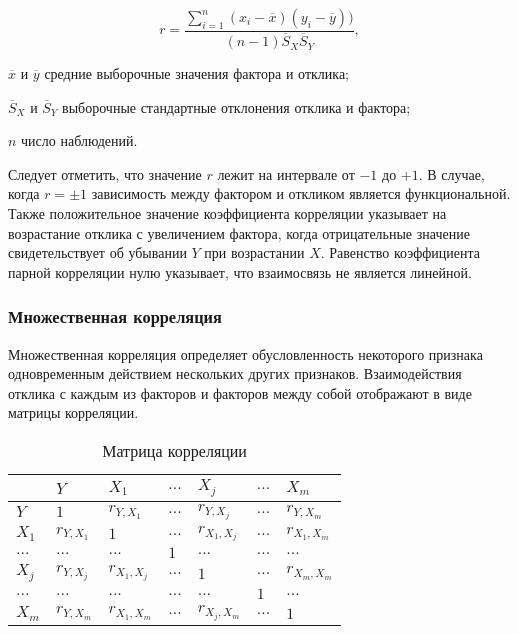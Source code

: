 \begin{equation}
\label{eq:corelMark}
r = \frac{\sum_{i = 1}^{n}(x_i - \overline{x})(y_i - \overline{y}))}{(n - 1)\overline{S}_X \overline{S}_Y},
\end{equation}
\begin{eqexpl}[15mm]
\item{$\overline{x}$ и $\overline{y}$} средние выборочные значения фактора и отклика;
\item{$\overline{S}_X$ и $\overline{S}_Y$} выборочные стандартные отклонения отклика и фактора;
\item{$n$} число наблюдений.
\end{eqexpl}

Следует отметить, что значение $r$ лежит на интервале от $-1$ до $+1$. В случае, когда $r=\pm1$ зависимость между фактором и откликом является функциональной. Также положительное значение коэффициента корреляции указывает на возрастание отклика с увеличением фактора, когда отрицательные значение свидетельствует об убывании $Y$ при возрастании $X$. Равенство коэффициента парной корреляции нулю указывает, что взаимосвязь не является линейной. \cite{corelMethod}

\subsubsection{Множественная корреляция}
Множественная корреляция определяет обусловленность некоторого признака одновременным действием нескольких других признаков. Взаимодействия отклика с каждым из факторов и факторов между собой отображают в виде матрицы корреляции. \cite{corelMethod}

\begin{table}[H]
\begin{center}
\caption{\label{table: corelMatrix} Матрица корреляции}
\begin{tabular}{l||llllll}
      & $Y$         & $X_1$         & $...$ & $X_j$          & $...$ & $X_m$             \\ \hline\hline
$Y$   & $1$         & $r_{Y,X_1}$   & $...$ & $r_{Y,X_j}$    & $...$ & $r_{Y,X_m}$    \\
$X_1$ & $r_{Y,X_1}$ & $1 $          & $...$ & $r_{X_1,X_j}$  & $...$ & $r_{X_1,X_m}$ \\
$...$ & $...$       & $...$         & $1$   & $...$          & $...$ & $...$              \\
$X_j$ & $r_{Y,X_j}$ & $r_{X_1,X_j}$ & $...$ & $1$            & $...$ & $r_{X_m,X_m}$ \\
$...$ & $...$       & $...$         & $...$ & $...$          & $1$   & $...$              \\
$X_m$ & $r_{Y,X_m}$ & $r_{X_1,X_m}$ & $...$ & $r_{X_j,X_m}$  & $...$ & $1$               
\end{tabular}
\end{center}
\end{table}

